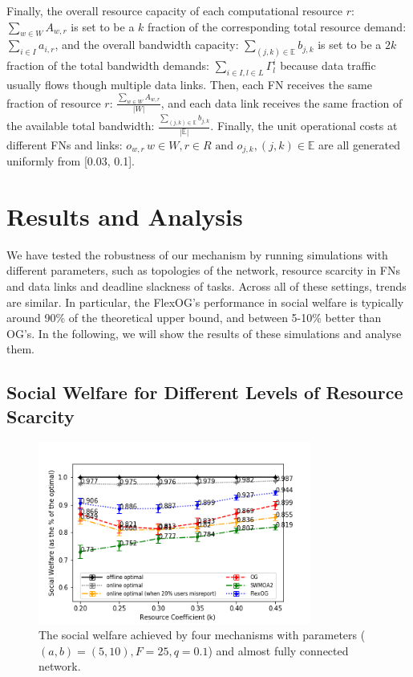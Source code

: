 \documentclass[11pt]{phdthesis}
\begin{document}
Finally, the overall resource capacity of each computational resource $ r $: $\sum_{w \in W} A_{w,r}$ is set to be a $k$ fraction of the corresponding total resource demand: $\sum_{i \in I}a_{i,r}$, and the overall bandwidth capacity: $\sum_{(j, k) \in \mathbb{E}}b_{j, k}$ is set to be a $2k$ fraction of the total bandwidth demands: $\sum_{i\in I, l\in L}\Gamma_l^i$ because data traffic usually flows though multiple data links. Then, each FN receives the same fraction of resource $ r $: $ \frac{\sum_{w \in W} A_{w,r}}{|W|} $, and each data link receives the same fraction of the available total bandwidth: $ \frac{\sum_{(j, k) \in \mathbb{E}}b_{j, k}}{|\mathbb{E}|} $. Finally, the unit operational costs at different FNs and links: $o_{w,r} \, w \in W, r \in R \textrm{ and } o_{j, k}, (j, k) \in \mathbb{E}$ are all generated uniformly from [0.03, 0.1]. 

\section{Results and Analysis} \label{results and analysis}

We have tested the robustness of our mechanism by running simulations with different parameters, such as topologies of the network, resource scarcity in FNs and data links and deadline slackness of tasks. Across all of these settings, trends are similar. In particular, the FlexOG's performance in social welfare is typically around 90\% of the theoretical upper bound, and between 5-10\% better than OG's. In the following, we will show the results of these simulations and analyse them. 

\subsection{Social Welfare for Different Levels of Resource Scarcity}

\begin{figure}[h]
    \centering
    \includegraphics[width=0.8\textwidth]{./Figures/comparison of social welfare (resource-coefficient).png}
    \caption{The social welfare achieved by four mechanisms with parameters ($ (a, b) = (5, 10), F = 25, q = 0.1 $) and almost fully connected network.}
    \label{fig: social_welfare_resource_coefficient} 
\end{figure}
\end{document}
